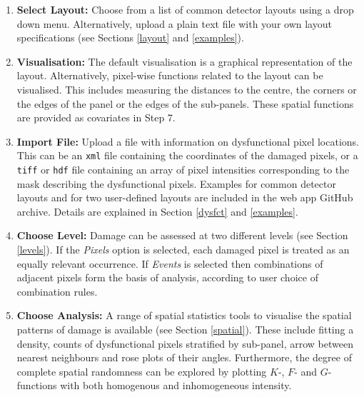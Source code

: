 \documentclass[11pt,a4paper]{article}
\begin{document}
\vfill\newpage

\begin{mdframed}

\medskip

\begin{enumerate}

\item {\bf Select Layout:} 
Choose from a list of common detector layouts using a drop down menu. Alternatively, upload a plain text file with your own layout specifications (see Sections \ref{layout} and \ref{examples}).

\item {\bf Visualisation:} 
The default visualisation is a graphical representation of the layout.
Alternatively, pixel-wise functions related to the layout can be visualised. 
This includes measuring the distances to the centre, the corners or the edges of the panel or the edges of the sub-panels. 
These spatial functions are provided as covariates in Step 7.

\item {\bf Import File:} 
Upload a file with information on dysfunctional pixel locations. 
This can be an \texttt{xml} file containing the coordinates of the damaged pixels, or a \texttt{tiff} or \texttt{hdf} file containing an array of pixel intensities corresponding to the mask describing the dysfunctional pixels. Examples for common detector layouts and for two user-defined layouts are included in the web app GitHub archive. Details are explained in Section \ref{dysfct} and \ref{examples}.
 
\item {\bf Choose Level:} 
Damage can be assessed at two different levels (see Section \ref{levels}). If the \emph{Pixels} option is selected, each damaged pixel is treated as an equally relevant occurrence. If \emph{Events} is selected then combinations of adjacent pixels form the basis of analysis, according to user choice of combination rules. 

\item {\bf Choose Analysis:} 
A range of spatial statistics tools to visualise the spatial patterns of damage is available (see Section \ref{spatial}). These include fitting a density, counts of dysfunctional pixels stratified by sub-panel, arrow between nearest neighbours and rose plots of their angles. 
Furthermore, the degree of complete spatial randomness can be explored by
plotting $K$-, $F$- and $G$-functions with both homogenous and inhomogeneous intensity.


\end{enumerate}
\end{mdframed}
\end{document}
